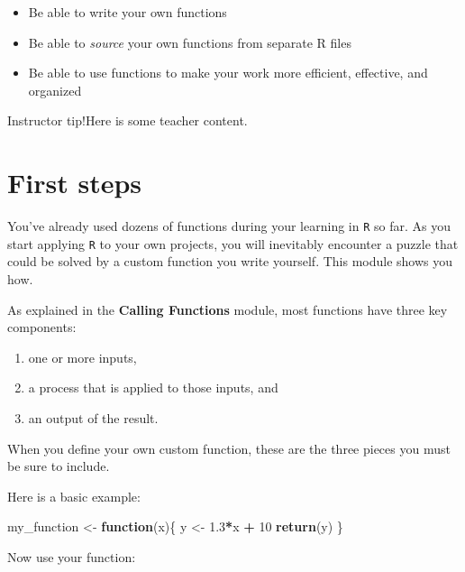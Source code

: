 \documentclass[
]{book}
\newenvironment{Shaded}{\begin{snugshade}}{\end{snugshade}}
\newcommand{\ControlFlowTok}[1]{\textcolor[rgb]{0.13,0.29,0.53}{\textbf{#1}}}
\newcommand{\DecValTok}[1]{\textcolor[rgb]{0.00,0.00,0.81}{#1}}
\newcommand{\FloatTok}[1]{\textcolor[rgb]{0.00,0.00,0.81}{#1}}
\newcommand{\KeywordTok}[1]{\textcolor[rgb]{0.13,0.29,0.53}{\textbf{#1}}}
\newcommand{\NormalTok}[1]{#1}
\newcommand{\OperatorTok}[1]{\textcolor[rgb]{0.81,0.36,0.00}{\textbf{#1}}}
\newcommand{\StringTok}[1]{\textcolor[rgb]{0.31,0.60,0.02}{#1}}
\providecommand{\tightlist}{%
  \setlength{\itemsep}{0pt}\setlength{\parskip}{0pt}}
\begin{document}
\begin{itemize}
\tightlist
\item
  Be able to write your own functions
\item
  Be able to \emph{source} your own functions from separate R files
\item
  Be able to use functions to make your work more efficient, effective, and organized
\end{itemize}

Instructor tip!Here is some teacher content.

\hypertarget{first-steps}{%
\section*{First steps}\label{first-steps}}

You've already used dozens of functions during your learning in \texttt{R} so far. As you start applying \texttt{R} to your own projects, you will inevitably encounter a puzzle that could be solved by a custom function you write yourself. This module shows you how.

As explained in the \textbf{Calling Functions} module, most functions have three key components:

\begin{enumerate}
\def\labelenumi{(\arabic{enumi})}
\tightlist
\item
  one or more inputs,\\
\item
  a process that is applied to those inputs, and\\
\item
  an output of the result.
\end{enumerate}

When you define your own custom function, these are the three pieces you must be sure to include.

Here is a basic example:

\begin{Shaded}
\begin{Highlighting}[]
\NormalTok{my_function <-}\StringTok{ }\ControlFlowTok{function}\NormalTok{(x)\{}
\NormalTok{  y <-}\StringTok{ }\FloatTok{1.3}\OperatorTok{*}\NormalTok{x }\OperatorTok{+}\StringTok{ }\DecValTok{10}
  \KeywordTok{return}\NormalTok{(y)}
\NormalTok{\}}
\end{Highlighting}
\end{Shaded}

Now use your function:
\end{document}
